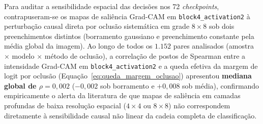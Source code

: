 \documentclass[
    12pt,
    openright,
    oneside,
    a4paper,
    english,
    brazil
]{abntex2}
\begin{document}
Para auditar a sensibilidade espacial das decisões nos 72 \textit{checkpoints}, contrapuseram-se os mapas de saliência Grad-CAM em \texttt{block4\_activation2} \cite{selvaraju2020gradcam} à perturbação causal direta por oclusão sistemática em grade \(8 \times 8\) \cite{zeiler2014visualizing} sob dois preenchimentos distintos (borramento gaussiano e preenchimento constante pela média global da imagem). Ao longo de todos os \(1.152\) pares analisados (amostra \(\times\) modelo \(\times\) método de oclusão), a correlação de postos de Spearman entre a intensidade Grad-CAM em \texttt{block4\_activation2} e a queda efetiva da margem de logit por oclusão (Equação~\eqref{eq:queda_margem_oclusao}) apresentou \textbf{mediana global de \(\rho = 0{,}002\)} (\(-0{,}002\) sob borramento e \(+0{,}008\) sob média), confirmando empiricamente o alerta da literatura \cite{adebayo2018sanity} de que mapas de saliência em camadas profundas de baixa resolução espacial (\(4 \times 4\) ou \(8 \times 8\)) não correspondem diretamente à sensibilidade causal não linear da cadeia completa de classificação.
\end{document}
